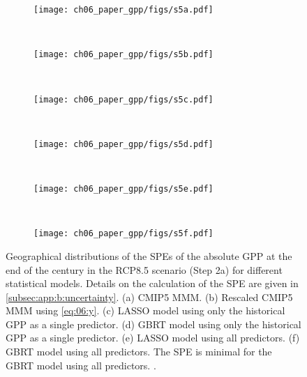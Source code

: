 \begin{figure}[p]
  \centering
  \begin{subfigure}[b]{\SubfigureWidth{}}
    \texttt{[image: ch06\_paper\_gpp/figs/s5a.pdf]}
    \caption{}
    \label{fig:app:b:step2a_results_errors:a}
  \end{subfigure}
  ~
  \begin{subfigure}[b]{\SubfigureWidth{}}
    \texttt{[image: ch06\_paper\_gpp/figs/s5b.pdf]}
    \caption{}
    \label{fig:app:b:step2a_results_errors:b}
  \end{subfigure}
  \\
  \begin{subfigure}[b]{\SubfigureWidth{}}
    \texttt{[image: ch06\_paper\_gpp/figs/s5c.pdf]}
    \caption{}
    \label{fig:app:b:step2a_results_errors:c}
  \end{subfigure}
  ~
  \begin{subfigure}[b]{\SubfigureWidth{}}
    \texttt{[image: ch06\_paper\_gpp/figs/s5d.pdf]}
    \caption{}
    \label{fig:app:b:step2a_results_errors:d}
  \end{subfigure}
  \\
  \begin{subfigure}[b]{\SubfigureWidth{}}
    \texttt{[image: ch06\_paper\_gpp/figs/s5e.pdf]}
    \caption{}
    \label{fig:app:b:step2a_results_errors:e}
  \end{subfigure}
  ~
  \begin{subfigure}[b]{\SubfigureWidth{}}
    \texttt{[image: ch06\_paper\_gpp/figs/s5f.pdf]}
    \caption{}
    \label{fig:app:b:step2a_results_errors:f}
  \end{subfigure}
  \caption[
    Geographical distributions of the \aclp{SPE} of the absolute \acf{GPP} at
    the end of the  century in the \acs{RCP}8.5 scenario (Step 2a) for
    different statistical models.
  ]{
    Geographical distributions of the \acfp{SPE} of the absolute \acf{GPP} at
    the end of the  century in the \acs{RCP}8.5 scenario (Step 2a) for
    different statistical models. Details on the calculation of the \acs{SPE}
    are given in \cref{subsec:app:b:uncertainty}. (a) \acs{CMIP}5 \acf{MMM}.
    (b) Rescaled \acs{CMIP}5 \acs{MMM} using \cref{eq:06:y}. (c) \Acf{LASSO}
    model using only the historical \acs{GPP} as a single predictor. (d)
    \Acf{GBRT} model using only the historical \acs{GPP} as a single predictor.
    (e) \acs{LASSO} model using all predictors. (f) \acs{GBRT} model using all
    predictors. The \acs{SPE} is minimal for the \acs{GBRT} model using all
    predictors. .
  }
  \label{fig:app:b:step2a_results_errors}
\end{figure}

